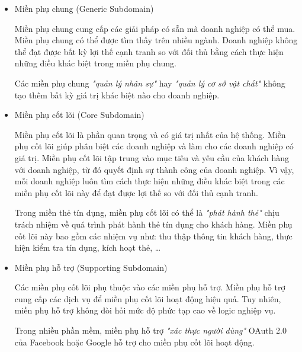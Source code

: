 \begin{itemize}

    \item Miền phụ chung (Generic Subdomain)

          Miền phụ chung cung cấp các giải pháp có sẵn mà doanh nghiệp có thể mua. Miền phụ chung có thể được tìm thấy trên nhiều ngành. Doanh nghiệp không thể đạt được bất kỳ lợi thế cạnh tranh so với đối thủ bằng cách thực hiện những điều khác biệt trong miền phụ chung.

          \begin{example} Các miền phụ chung \emph{"quản lý nhân sự"} hay \emph{"quản lý cơ sở vật chất"} không tạo thêm bất kỳ giá trị khác biệt nào cho doanh nghiệp. \end{example}

    \item Miền phụ cốt lõi (Core Subdomain)

          Miền phụ cốt lõi là phần quan trọng và có giá trị nhất của hệ thống. Miền phụ cốt lõi giúp phân biệt các doanh nghiệp và làm cho các doanh nghiệp có giá trị. Miền phụ cốt lõi tập trung vào mục tiêu và yêu cầu của khách hàng với doanh nghiệp, từ đó quyết định sự thành công của doanh nghiệp. Vì vậy, mỗi doanh nghiệp luôn tìm cách thực hiện những điều khác biệt trong các miền phụ cốt lõi này để đạt được lợi thế so với đối thủ cạnh tranh.

          \begin{example} Trong miền thẻ tín dụng, miền phụ cốt lõi có thể là \emph{"phát hành thẻ"} chịu trách nhiệm về quá trình phát hành thẻ tín dụng cho khách hàng. Miền phụ cốt lõi này bao gồm các nhiệm vụ như: thu thập thông tin khách hàng, thực hiện kiểm tra tín dụng, kích hoạt thẻ, \dots \end{example}

    \item Miền phụ hỗ trợ (Supporting Subdomain)

          Các miền phụ cốt lõi phụ thuộc vào các miền phụ hỗ trợ. Miền phụ hỗ trợ cung cấp các dịch vụ để miền phụ cốt lõi hoạt động hiệu quả. Tuy nhiên, miền phụ hỗ trợ không đòi hỏi mức độ phức tạp cao về logic nghiệp vụ.

          \begin{example} Trong nhiều phần mềm, miền phụ hỗ trợ \emph{"xác thực người dùng"} OAuth 2.0 của Facebook hoặc Google hỗ trợ cho miền phụ cốt lõi hoạt động. \end{example}

\end{itemize}


